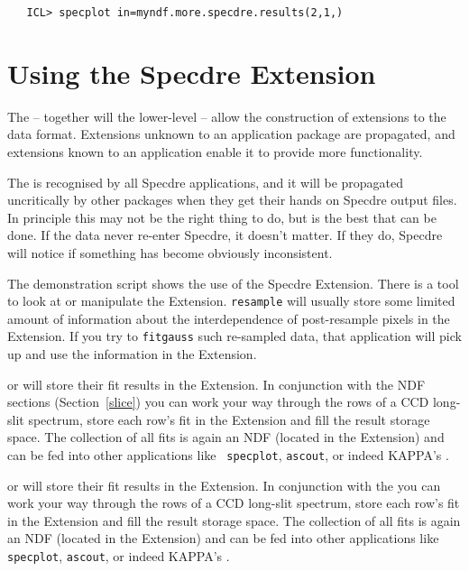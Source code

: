 \begin{verbatim}
   ICL> specplot in=myndf.more.specdre.results(2,1,)
\end{verbatim}


\section{\label{useext}Using the Specdre Extension}

   The
   -- together will the lower-level
   -- allow the construction of extensions to the data format.
   Extensions unknown to an application package are propagated, and
   extensions known to an application enable it to provide more
   functionality.

   The
   is recognised by all Specdre applications, and it will be propagated
   uncritically by other packages when they get their hands on Specdre
   output files. In principle this may not be the right thing to do, but
   is the best that can be done. If the data never re-enter Specdre, it
   doesn't matter. If they do, Specdre will notice if something has
   become obviously inconsistent.

   The demonstration script shows the use of the Specdre Extension.
   There is a tool
{\tt{}} to look at or manipulate the
   Extension. {\tt resample} will usually store some limited amount of
   information about the interdependence of post-resample pixels in the
   Extension. If you try to {\tt fitgauss} such re-sampled data, that
   application will pick up and use the information in the Extension.

\begin{latexonly}
{\tt{}}
   or
{\tt{}}
   will store their fit results in the Extension. In conjunction with
   the NDF sections
(Section~\ref{slice})
   you can work your way through the rows of a CCD long-slit spectrum,
   store each row's fit in the Extension and fill the result storage
   space. The collection of all fits is again an NDF (located in the
   Extension) and can be fed into other applications like {\tt
   specplot}, {\tt ascout}, or indeed KAPPA's
{\tt{}}.
\end{latexonly}
\begin{htmlonly}
{\tt{}}
   or
{\tt{}}
   will store their fit results in the Extension. In conjunction with
   the
   you can work your way through the rows of a CCD long-slit spectrum,
   store each row's fit in the Extension and fill the result storage
   space. The collection of all fits is again an NDF (located in the
   Extension) and can be fed into other applications like {\tt
   specplot}, {\tt ascout}, or indeed KAPPA's
{\tt{}}.
\end{htmlonly}

